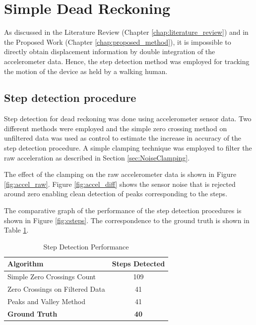 \section{Simple Dead Reckoning}

As discussed in the Literature Review (Chapter \ref{chap:literature_review}) and
in the Proposed Work (Chapter \ref{chap:proposed_method}), it is impossible to
directly obtain displacement information by double integration of the
accelerometer data. Hence, the step detection method was employed for tracking
the motion of the device as held by a walking human.

\subsection{Step detection procedure}

Step detection for dead reckoning was done using accelerometer sensor data.
Two different methods were employed and the simple zero crossing method on 
unfiltered data was used as control to estimate the increase in accuracy of the
step detection procedure. A simple clamping technique was employed to filter the
raw acceleration as described in Section \ref{sec:NoiseClamping}.

The effect of the clamping on the raw accelerometer data is shown in 
Figure \ref{fig:accel_raw}. Figure \ref{fig:accel_diff} shows the sensor noise
that is rejected around zero enabling clean detection of peaks corresponding to
the steps.

The comparative graph of the performance of the step detection procedures 
is shown in Figure \ref{fig:csteps}. The correspondence to the ground truth
is shown in Table \ref{tbl:step_table}.

\begin{table}[tbph]
\centering
\begin{tabular}{||l|c||}
\hline
\hline
\textbf{Algorithm} & \textbf{Steps Detected} \\
\hline

Simple Zero Crossings Count & 109 \\
Zero Crossings on Filtered Data & 41 \\
Peaks and Valley Method & 41 \\
\textbf{Ground Truth} & \textbf{40} \\
\hline
\hline
\end{tabular}
\caption{Step Detection Performance\label{tbl:step_table}}
\end{table}

